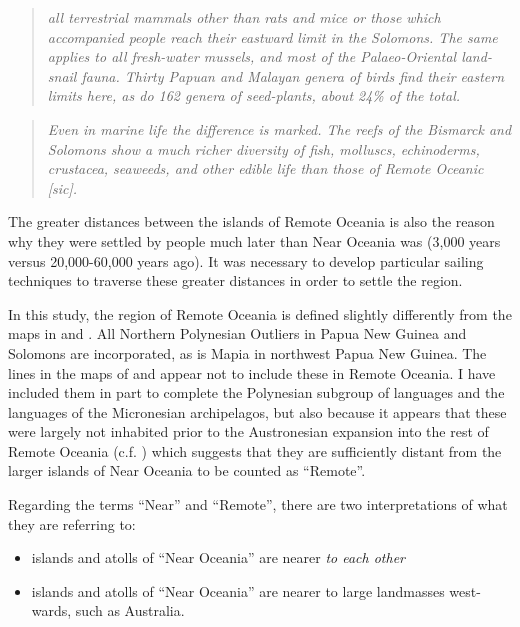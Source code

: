 \documentclass[12pt,letterpaper]{article}
\begin{document}
\begin{quotation}
\noindent \emph{all terrestrial mammals other than rats and mice or those which accompanied people reach their eastward limit in the Solomons. The same applies to all fresh-water mussels, and most of the Palaeo-Oriental land-snail fauna. Thirty Papuan and Malayan genera of birds find their eastern limits here, as do 162 genera of seed-plants, about 24\% of the total.}
\end{quotation}
\begin{flushright} \citet[495]{green1991near}
\end{flushright}

\begin{quotation}
\noindent \emph{Even in marine life the difference is marked. The reefs of the Bismarck and Solomons show a much richer diversity of fish, molluscs, echinoderms, crustacea, seaweeds, and other edible life than those of Remote Oceanic [sic].}
\end{quotation}
\begin{flushright}  \citet[19]{pawley2007locatingoceanic} \end{flushright}

The greater distances between the islands of Remote Oceania is also the reason why they were settled by people much later than Near Oceania was (3,000 years versus 20,000-60,000 years ago). It was necessary to develop particular sailing techniques to traverse these greater distances in order to settle the region.

In this study, the region of Remote Oceania is defined slightly differently from the maps in \citet{green1991near} and \citet{pawley2007locatingoceanic}. All Northern Polynesian Outliers in Papua New Guinea and Solomons are incorporated, as is Mapia in northwest Papua New Guinea. The lines in the maps of \citet{green1991near} and \citet{pawley2007locatingoceanic} appear not to include these in Remote Oceania. I have included them in part to complete the Polynesian subgroup of languages and the languages of the Micronesian archipelagos, but also because it appears that these were largely not inhabited prior to the Austronesian expansion into the rest of Remote Oceania (c.f. \citet[23]{kirch2012basline}) which suggests that they are sufficiently distant from the larger islands of Near Oceania to be counted as ``Remote''.

Regarding the terms ``Near'' and ``Remote'', there are two interpretations of what they are referring to:

\begin{itemize}
    \item islands and atolls of ``Near Oceania'' are nearer \emph{to each other} 
    \item islands and atolls of ``Near Oceania'' are nearer to large landmasses west-wards, such as Australia.
\end{itemize}
\end{document}
